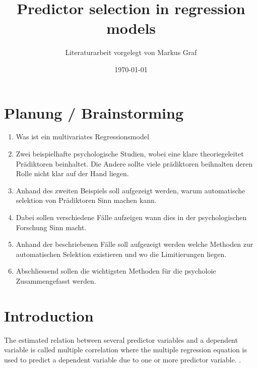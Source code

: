 \documentclass[12pt,doc]{apa}
\begin{document}
\title{Predictor selection in regression models}
\author{Literaturarbeit vorgelegt von Markus Graf}
\date{\today}
\maketitle
\setlength{\parindent}{0pt}
\newpage
\tableofcontents
\newpage
\section{Planung / Brainstorming}
\begin{enumerate}
\item Was ist ein multivariates Regressionsmodel
\item Zwei beispielhafte psychologische Studien, wobei eine klare theoriegeleitet Prädiktoren beinhaltet. Die Andere sollte viele prädiktoren beihnalten deren Rolle nicht klar auf der Hand liegen.
\item Anhand des zweiten Beispiels soll aufgezeigt werden, warum automatische selektion von Prädiktoren Sinn machen kann.
\item Dabei sollen verschiedene Fälle aufzeigen wann dies in der psychologischen Forschung Sinn macht.
\item Anhand der beschriebenen Fälle soll aufgezeigt werden welche Methoden zur automatischen Selektion existieren und wo die Limitierungen liegen.
\item Abschliessend sollen die wichtigsten Methoden für die psycholoie Zusammengefasst werden.
\end{enumerate}
\section{Introduction}
The estimated relation between several predictor variables and a dependent variable is called multiple correlation where  the multiple regression equation is used to predict a dependent variable due to one or more predictor variable. \cite[Chap 13]{bortz2011}.
\end{document}
